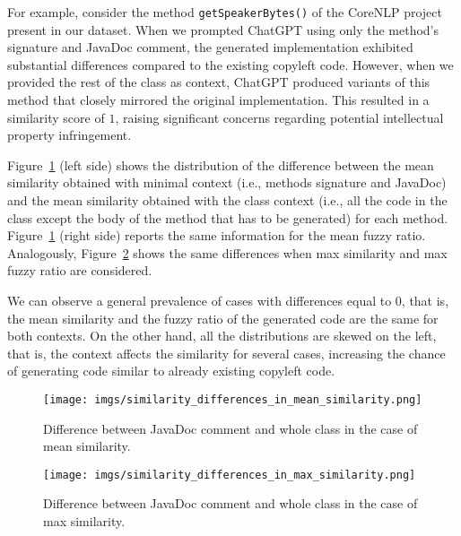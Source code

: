 For example, consider the method \texttt{getSpeakerBytes()} of the CoreNLP project present in our dataset. When we prompted ChatGPT using only the method's signature and JavaDoc comment, the generated implementation exhibited substantial differences compared to the existing copyleft code. 
However, when we provided the rest of the class as context, ChatGPT produced variants of this method that closely mirrored the original implementation. This resulted in a similarity score of $1$, raising significant concerns regarding potential intellectual property infringement.

Figure~\ref{fig:similarity_differences_in_mean_similarity} (left side) shows the distribution of the difference between the mean similarity obtained with minimal context (i.e., methods signature and JavaDoc) and the mean similarity obtained with the class context (i.e., all the code in the class except the body of the method that has to be generated) for each method. Figure~\ref{fig:similarity_differences_in_mean_similarity} (right side) reports the same information for the mean fuzzy ratio.  Analogously, Figure~\ref{fig:similarity_differences_in_max_similarity} shows the same differences when max similarity and max fuzzy ratio are considered.%

We can observe a general prevalence of cases with differences equal to $0$, that is, the mean similarity and the fuzzy ratio of the generated code are the same for both contexts. On the other hand, all the distributions are skewed on the left, that is, the context affects the similarity for several cases, increasing the chance of generating code similar to already existing copyleft code.

\begin{figure}[h]
    \centering
    \texttt{[image: imgs/similarity\_differences\_in\_mean\_similarity.png]}
    \vspace{-10pt} 
    
    \caption{Difference between JavaDoc comment and whole class in the case of mean similarity.}
    \label{fig:similarity_differences_in_mean_similarity}
    \vspace{-5pt} 
\end{figure}
\begin{figure}[h]
    \centering
    \texttt{[image: imgs/similarity\_differences\_in\_max\_similarity.png]}
    \vspace{-10pt} 
    
    \caption{Difference between JavaDoc comment and whole class in the case of max similarity.}
    \label{fig:similarity_differences_in_max_similarity}
    \vspace{-5pt} 
\end{figure}



